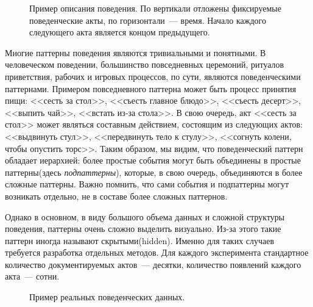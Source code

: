 \documentclass[12pt,fсeqn]{article}
\begin{document}
\begin{figure}[H]
\noindent{}
\caption{Пример описания поведения. По вертикали отложены фиксируемые поведенческие акты, по горизонтали~--- время. 
Начало каждого следующего акта является концом предыдущего. }
\end{figure}

Многие паттерны поведения являются тривиальными и понятными. В человеческом поведении, большинство повседневных церемоний,
ритуалов приветствия, рабочих и игровых процессов, по сути, являются поведенческими паттернами. Примером повседневного паттерна может 
быть процесс принятия пищи: <<сесть за стол>>, <<съесть главное блюдо>>, <<съесть десерт>>, <<выпить чай>>, <<встать из-за стола>>. 
В свою очередь, акт <<сесть за стол>> может являться составным действием, состоящим из следующих актов: <<выдвинуть стул>>, 
<<передвинуть тело к стулу>>, <<согнуть колени, чтобы опустить торс>>. Таким образом, мы видим, что поведенческий паттерн обладает 
иерархией: более простые события могут быть объединены в простые паттерны(здесь {\em подпаттерны}), которые, в свою очередь, объединяются в более сложные паттерны.
Важно помнить, что сами события и подпаттерны могут возникать отдельно, не в составе более сложных паттернов. 

Однако в основном, в виду большого объема данных и сложной структуры поведения, паттерны очень сложно выделить визуально. Из-за
этого такие паттерн иногда называют скрытыми(hidden). Именно для таких случаев требуется разработка отдельных методов. 
Для каждого эксперимента стандартное количество документируемых актов~--- десятки, количество появлений каждого акта~--- сотни.
\begin{figure}[H]
\noindent{}
\caption{Пример реальных поведенческих данных. }
\end{figure}
\end{document}
